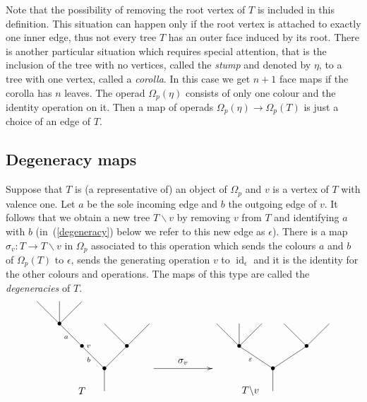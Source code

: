\documentclass[a4paper]{amsart}
\theoremstyle{plain}
\theoremstyle{definition}
\theoremstyle{remark}
\DeclareMathOperator{\id}{id}
\newcommand{\rpd}{\Omega_p}
\newcommand{\To}{\longrightarrow}
\numberwithin{equation}{section}
\numberwithin{figure}{section}
\begin{document}
Note that the possibility of removing the root vertex of $T$ is
included in this definition. This situation can happen only if the root vertex is attached to exactly one inner edge, thus
not every tree $T$ has an outer face induced by its root. There is another particular situation which requires special
attention, that is the inclusion of the tree with no vertices, called  the \emph{stump} and denoted by $\eta$, to a tree with one vertex,
called a \emph{corolla}. In this case we get $n+1$ face maps if the corolla has $n$ leaves. The operad $\Omega_p(\eta)$ consists of
only one colour and the identity operation on it. Then a map of operads $\Omega_p(\eta)\To \Omega_p(T)$ is just a choice of an
edge of $T$.

\subsection{Degeneracy maps}
Suppose that $T$ is (a representative of) an object of $\rpd$ and
$v$ is a vertex of $T$ with valence one. Let $a$ be the sole
incoming edge and $b$ the outgoing edge of $v$. It follows that we
obtain a new tree $T\backslash v$ by removing $v$ from $T$ and
identifying $a$ with $b$ (in~(\ref{degeneracy}) below we refer
to this new edge as $\epsilon$). There is a map $\sigma_v:T \To
    T\backslash v$ in $\rpd$ associated to this operation which sends
the colours $a$ and $b$ of $\Omega_p(T)$ to $\epsilon$, sends the
generating operation $v$ to $\id_\epsilon$ and it is the identity
for the other colours and operations. The maps of this type are called the \emph{degeneracies} of $T$.
\begin{equation}
    \xy<0.08cm,0cm>:
    (0,20)*{}="1";
    (10,20)*=0{}="2";
    (20,20)*=0{}="3";
    (10,10)*=0{\bullet}="4";
    (20,0)*=0{\bullet}="5";
    (30,-10)*=0{\bullet}="6";
    (40,0)*=0{\bullet}="7";
    (30,10)*=0{}="8";
    (50,10)*=0{}="9";
    (30,-20)*=0{}="10";
    (80,10)*=0{}="11";
    (90,10)*=0{}="12";
    (100,10)*=0{}="13";
    (90,0)*=0{\bullet}="14";
    (105,-10)*=0{\bullet}="15";
    (120,0)*=0{\bullet}="16";
    (110,10)*=0{}="17";
    (130,10)*=0{}="18";
    (105,-20)*=0{}="19";
    (13,4)*{\scriptstyle a};
    (23,-6)*{\scriptstyle b};
    (23,0)*{\scriptstyle v};
    (95,-6)*{\scriptstyle \varepsilon};
    (65,-7)*{\sigma_v};
    "1";"4" **\dir{-};
    "2";"4" **\dir{-};
    "3";"4" **\dir{-};
    "4";"5" **\dir{-};
    "5";"6" **\dir{-};
    "6";"7" **\dir{-};
    "6";"10" **\dir{-};
    "7";"8" **\dir{-};
    "7";"9" **\dir{-};
    "11";"14" **\dir{-};
    "12";"14" **\dir{-};
    "13";"14" **\dir{-};
    "14";"15" **\dir{-};
    "15";"16" **\dir{-};
    "16";"17" **\dir{-};
    "16";"18" **\dir{-};
    "15";"19" **\dir{-};
    {\ar(52, -10)*{};(78,-10)*{}};
    (20,-20)*{T};
    (95,-20)*{T\backslash v};
    \endxy
    \label{degeneracy}
\end{equation}
\end{document}
